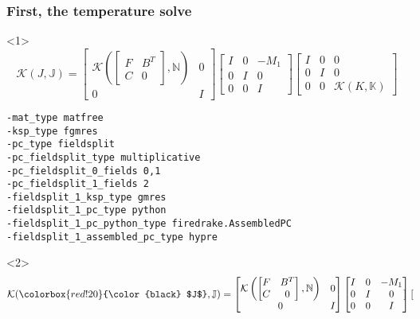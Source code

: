 \documentclass[presentation]{beamer}
\newcommand{\KSP}[2]{\ensuremath{\mathcal{K}\left(#1, \mathbb{#2}\right)}}
\newcommand{\ksp}[1]{\KSP{#1}{#1}}
\newcommand{\highlight}[1]{\colorbox{red!20}{\color{black} #1}}
\begin{document}
\begin{frame}[fragile]
  \frametitle{First, the temperature solve}
  \begin{onlyenv}<1>
    \begin{equation*}
      \mathcal{K}(J, \mathbb{J}) =
      \begin{bmatrix}
        \KSP{\begin{bmatrix}
            F & B^T\\
            C & 0
          \end{bmatrix}}{N} & 0\\
        0 & I
      \end{bmatrix}
      \begin{bmatrix}
        I & 0 & -M_1\\
        0 & I & 0 \\
        0 & 0 & I
      \end{bmatrix}
      \begin{bmatrix}
        I & 0 & 0\\
        0 & I & 0\\
        0 & 0 &\ksp{K}
      \end{bmatrix}
    \end{equation*}
\begin{verbatim}
-mat_type matfree
-ksp_type fgmres
-pc_type fieldsplit
-pc_fieldsplit_type multiplicative
-pc_fieldsplit_0_fields 0,1
-pc_fieldsplit_1_fields 2
-fieldsplit_1_ksp_type gmres
-fieldsplit_1_pc_type python
-fieldsplit_1_pc_python_type firedrake.AssembledPC
-fieldsplit_1_assembled_pc_type hypre
\end{verbatim}
  \end{onlyenv}
  \begin{onlyenv}<2>
    \color{gray}
    \begin{equation*}
      \mathcal{K}(\highlight{$J$}, \mathbb{J}) =
      \begin{bmatrix}
        \KSP{\begin{bmatrix}
            F & B^T\\
            C & 0
          \end{bmatrix}}{N} & 0\\
        0 & I
      \end{bmatrix}
      \begin{bmatrix}
        I & 0 & -M_1\\
        0 & I & 0 \\
        0 & 0 & I
      \end{bmatrix}
      \begin{bmatrix}

\end{bmatrix}
\end{equation*}
\end{onlyenv}
\end{frame}
\end{document}
